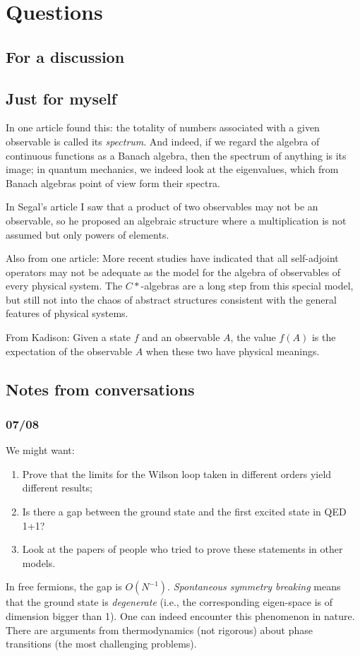 \section{Questions}
\subsection{For a discussion}

\subsection{Just for myself}

In one article found this: the totality of numbers associated with a given observable is called its \emph{spectrum}. And indeed, if we regard the algebra of continuous functions as a Banach algebra, then the spectrum of anything is its image; in quantum mechanics, we indeed look at the eigenvalues, which from Banach algebras point of view form their spectra.

In Segal's article I saw that a product of two observables may not be an observable, so he proposed an algebraic structure where a multiplication is not assumed but only powers of elements.

Also from one article:
More recent studies have indicated that all self-adjoint operators may not be adequate as the model for the algebra of observables of every physical system. The $C*$-algebras are a long step from this special model, but still not into the chaos of abstract structures consistent with the general features of physical systems. 

From Kadison:
Given a state $f$ and an observable $A$, the value $f(A)$ is the expectation of the observable $A$ when these two have physical meanings.

\subsection{Notes from conversations}
\subsubsection{07/08}
We might want:
\begin{enumerate}
\item Prove that the limits for the Wilson loop taken in different orders yield different results;
\item Is there a gap between the ground state and the first excited state in QED 1+1?
\item Look at the papers of people who tried to prove these statements in other models.
\end{enumerate}
In free fermions, the gap is $O(N^{-1})$. \emph{Spontaneous symmetry breaking} means that the ground state is \emph{degenerate} (i.e., the corresponding eigen-space is of dimension bigger than 1). One can indeed encounter this phenomenon in nature. There are arguments from thermodynamics (not rigorous) about phase transitions (the most challenging problems).